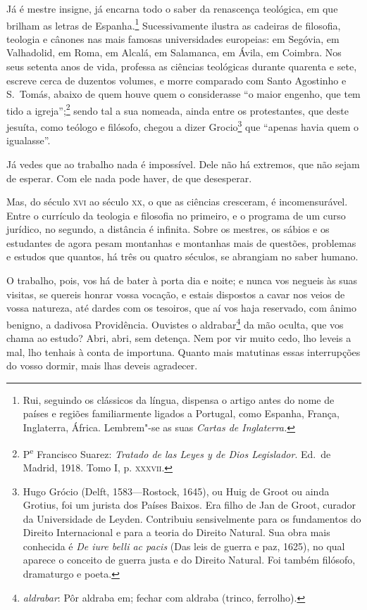 Já é mestre insigne, já encarna todo o saber da renascença
teológica, em que brilham as letras de Espanha.\footnote{ Rui, seguindo
os clássicos da língua, dispensa o artigo antes do nome de países e
regiões familiarmente ligados a Portugal, como Espanha, França,
Inglaterra, África. Lembrem"-se as suas \textit{Cartas de Inglaterra.}}
Sucessivamente ilustra as cadeiras de filosofia, teologia e
cânones nas mais famosas
universidades europeias: em Segóvia, em Valhadolid, em Roma, em
Alcalá, em Salamanca, em Ávila, em Coimbra. 
Nos seus setenta anos de vida, professa as ciências
teológicas durante quarenta e sete, escreve cerca de duzentos volumes,
e morre comparado com Santo Agostinho e S.~Tomás, abaixo de quem houve quem
o considerasse ``o maior engenho, que tem tido a
igreja'';\footnote{ P\textsuperscript{e} Francisco Suarez: \textit{Tratado
de las Leyes y de Dios Legislador}. Ed.~de Madrid, 1918. Tomo I, p.
\textsc{xxxvii}.} sendo tal a sua nomeada, ainda entre os protestantes,
que deste jesuíta, como teólogo e filósofo, chegou a dizer
Grocio\footnote{ Hugo Grócio (Delft, 1583---Rostock, 1645),
ou Huig de Groot ou ainda Grotius, foi um
jurista dos Países Baixos. Era filho de Jan de Groot, 
curador da Universidade de Leyden. Contribuiu sensivelmente 
para os fundamentos do Direito Internacional e para a teoria do
Direito Natural. Sua obra mais conhecida é \textit{De iure belli ac pacis} 
(Das leis de guerra e paz, 1625), no qual aparece o conceito de guerra 
justa e do Direito Natural. Foi também filósofo, dramaturgo e poeta.} 
que ``apenas havia quem o igualasse''.

Já vedes que ao trabalho nada é impossível. Dele não há extremos,
que não sejam de esperar. Com ele nada pode haver, de que desesperar.

Mas, do século \textsc{xvi} ao século \textsc{xx}, o que as ciências cresceram, é
incomensurável. Entre o currículo da teologia e filosofia no primeiro,
e o programa de um curso jurídico, no segundo, a distância é infinita.
Sobre os mestres, os sábios e os estudantes de agora pesam montanhas e
montanhas mais de questões, problemas e estudos que quantos, há três ou
quatro séculos, se abrangiam no saber humano.

O trabalho, pois, vos há de bater à porta dia e noite; e nunca vos
negueis às suas visitas, se quereis honrar vossa vocação, e estais
dispostos a cavar nos veios de vossa natureza, até dardes com os
tesoiros, que aí vos haja reservado, com ânimo benigno, a dadivosa
Providência. Ouvistes o aldrabar\footnote{ \textit{aldrabar}: Pôr
aldraba em; fechar com aldraba (trinco, ferrolho).} da mão oculta, que vos chama
ao estudo? Abri, abri, sem detença. Nem por vir muito cedo, lho leveis
a mal, lho tenhais à conta de importuna. Quanto mais
matutinas essas interrupções do vosso dormir, mais lhas deveis agradecer.

